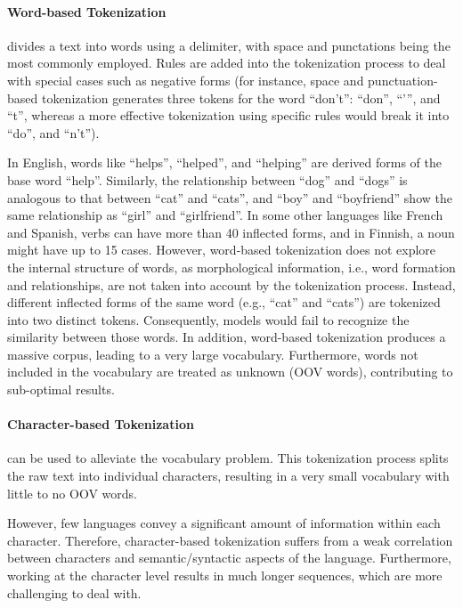 \paragraph{Word-based Tokenization} divides a text into words using a delimiter, with space and punctations being the most commonly employed. Rules are added into the tokenization process to deal with special cases such as negative forms (for instance, space and punctuation-based tokenization generates three tokens for the word “don't”:  “don”, “'”, and “t”, whereas a more effective tokenization using specific rules would  break it into “do”, and “n't”).

In English, words like “helps”, “helped”, and “helping” are derived forms of the base word “help”. Similarly, the relationship between “dog” and “dogs” is analogous to that between “cat” and “cats”, and “boy” and “boyfriend” show the same relationship as “girl” and “girlfriend”. In some other languages like French and Spanish, verbs can have more than 40 inflected forms, and in Finnish, a noun might have up to 15 cases. However, word-based tokenization does not explore the internal structure of words, as morphological information, i.e., word formation and relationships, are not taken into account by the tokenization process. Instead, different inflected forms of the same word (e.g., “cat” and “cats”) are tokenized into two distinct tokens. Consequently, models would fail to recognize the similarity between those words. In addition, word-based tokenization produces a massive corpus, leading to a very large vocabulary. Furthermore, words not included in the vocabulary are treated as unknown (\ac{OOV} words), contributing to sub-optimal results.

\paragraph{Character-based Tokenization} \citep{wehrmann2017character} can be used to alleviate the vocabulary problem. This tokenization process splits the raw text into individual characters, resulting in a very small vocabulary with little to no \ac{OOV} words. 

However, few languages convey a significant amount of information within each character. Therefore, character-based tokenization suffers from a weak correlation between characters and semantic/syntactic aspects of the language. Furthermore, working at the character level results in much longer sequences, which are more challenging to deal with.

